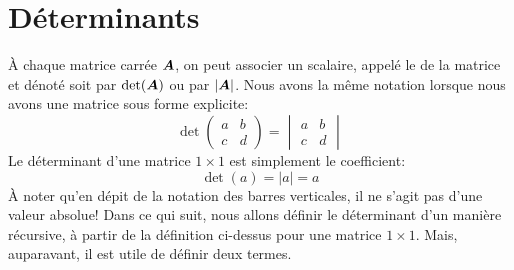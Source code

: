 \chapter{Déterminants}

À chaque matrice carrée $\boldsymbol{A}$, on peut associer un scalaire, appelé le  de la matrice
et dénoté soit par $\det(\boldsymbol{A})$ ou par $|\boldsymbol{A}|$.  Nous avons la même notation lorsque nous avons
une matrice sous forme explicite:
\[
\det\begin{pmatrix}
a & b \\
c & d
\end{pmatrix}
=
\begin{vmatrix}
a & b \\
c & d
\end{vmatrix}
\]
Le déterminant d'une matrice $1\times  1$ est simplement le coefficient:
\[
\det(a) = |a| = a
\]
À noter qu'en dépit de la notation des barres verticales, il ne s'agit pas d'une
valeur absolue!   
Dans ce qui suit, nous allons définir le déterminant d'un manière
récursive, à partir de la définition ci-dessus pour une matrice $1\times  1$.
Mais, auparavant, il est utile de définir deux termes.

